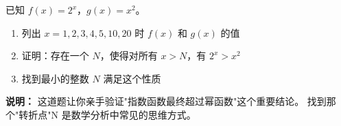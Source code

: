 
\begin{exercise}[7]
已知 \(f(x) = 2^x\)，\(g(x) = x^2\)。
\begin{enumerate}
  \item[(1)] 列出 \(x = 1, 2, 3, 4, 5, 10, 20\) 时 \(f(x)\) 和 \(g(x)\) 的值
  \item[(2)] 证明：存在一个 \(N\)，使得对所有 \(x > N\)，有 \(2^x > x^2\)
  \item[(3)] 找到最小的整数 \(N\) 满足这个性质
\end{enumerate}

\textbf{说明：} 这道题让你亲手验证"指数函数最终超过幂函数"这个重要结论。
找到那个"转折点"N 是数学分析中常见的思维方式。
\end{exercise}
